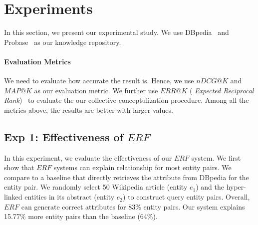 
\section{Experiments}
\label{sec:exp}

In this section, we present our experimental study.
We use DBpedia~\cite{dbpedia} and Probase~\cite{wu2012probase} as our knowledge repository.
\
\vspace{-4mm}
\paragraph*{Evaluation Metrics}
We need to evaluate how accurate the result is. 
Hence, we use $nDCG@K$ and $MAP@K$ as our evaluation metric.
We further use $ ERR@K$ ( {\it Expected Reciprocal Rank})~\cite{chapelle2009expected} to evaluate the our collective conceptulization procedure.
Among all the metrics above, the results are better with larger values.


\subsection{Exp 1: Effectiveness of $ERF$}
In this experiment, we evaluate the effectiveness of our $ERF$ system.
We first show that $ERF$ systems can explain relationship for most entity pairs.
We compare to a baseline that directly retrieves the attribute from DBpedia for the entity pair.
We randomly select 50 Wikipedia article (entity $e_1$) and the hyper-linked entities in its abstract (entity $e_2$)
to construct query entity pairs.
Overall, $ERF$ can generate correct attributes for 83\% entity pairs.
Our system explains 15.77\% more entity pairs than the baseline (64\%).

